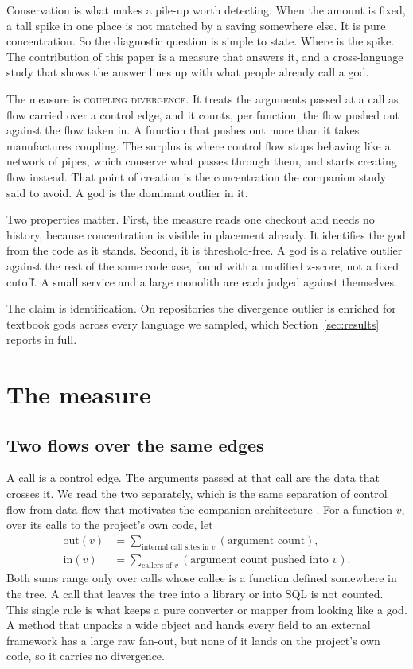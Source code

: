 \documentclass[11pt,a4paper]{article}
\newcommand{\cdiv}{\textsc{coupling divergence}}
\begin{document}
Conservation is what makes a pile-up worth detecting. When the amount is fixed, a
tall spike in one place is not matched by a saving somewhere else. It is pure
concentration. So the diagnostic question is simple to state. Where is the spike.
The contribution of this paper is a measure that answers it, and a cross-language
study that shows the answer lines up with what people already call a god.

The measure is \cdiv{}. It treats the arguments passed at a call as flow carried
over a control edge, and it counts, per function, the flow pushed out against the
flow taken in. A function that pushes out more than it takes manufactures coupling.
The surplus is where control flow stops behaving like a network of pipes, which
conserve what passes through them, and starts creating flow instead. That point of
creation is the concentration the companion study said to avoid. A god is the
dominant outlier in it.

Two properties matter. First, the measure reads one checkout and needs no history,
because concentration is visible in placement already. It identifies the god from
the code as it stands. Second, it is threshold-free. A god is a relative outlier
against the rest of the same codebase, found with a modified z-score, not a fixed
cutoff. A small service and a large monolith are each judged against themselves.

The claim is identification. On \nMeasured{} repositories the divergence outlier is
enriched for textbook gods across every language we sampled, which
Section~\ref{sec:results} reports in full.

\section{The measure}\label{sec:measure}
\subsection{Two flows over the same edges}
A call is a control edge. The arguments passed at that call are the data that
crosses it. We read the two separately, which is the same separation of control
flow from data flow that motivates the companion architecture \cite{conserved}.
For a function $v$, over its calls to the project's own code, let
\begin{align*}
\mathrm{out}(v) &= \sum_{\text{internal call sites in } v} (\text{argument count}), \\
\mathrm{in}(v)  &= \sum_{\text{callers of } v} (\text{argument count pushed into } v).
\end{align*}
Both sums range only over calls whose callee is a function defined somewhere in the
tree. A call that leaves the tree into a library or into SQL is not counted. This
single rule is what keeps a pure converter or mapper from looking like a god. A
method that unpacks a wide object and hands every field to an external framework
has a large raw fan-out, but none of it lands on the project's own code, so it
carries no divergence.
\end{document}
